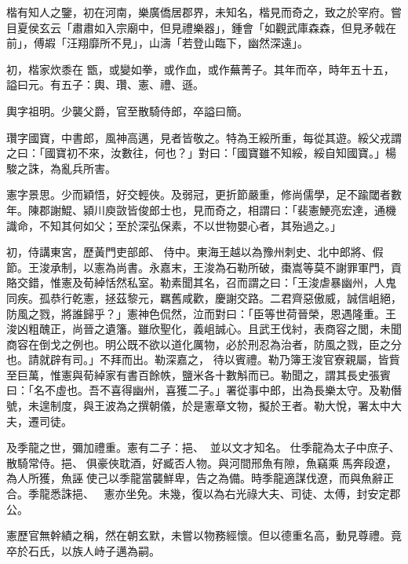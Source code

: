 \begin{pinyinscope}
 楷有知人之鑒，初在河南，樂廣僑居郡界，未知名，楷見而奇之，致之於宰府。嘗目夏侯玄云「肅肅如入宗廟中，但見禮樂器」，鍾會「如觀武庫森森，但見矛戟在前」，傅嘏「汪翔靡所不見」，山濤「若登山臨下，幽然深遠」。



 初，楷家炊黍在
 甑，或變如拳，或作血，或作蕪菁子。其年而卒，時年五十五，謚曰元。有五子：輿、瓚、憲、禮、遜。



 輿字祖明。少襲父爵，官至散騎侍郎，卒謚曰簡。



 瓚字國寶，中書郎，風神高邁，見者皆敬之。特為王綏所重，每從其遊。綏父戎謂之曰：「國寶初不來，汝數往，何也？」對曰：「國寶雖不知綏，綏自知國寶。」楊駿之誅，為亂兵所害。



 憲字景思。少而穎悟，好交輕俠。及弱冠，更折節嚴重，修尚儒學，足不踰閾者數年。陳郡謝鯤、潁川庾敳皆俊郎士也，見而奇之，相謂曰：「裴憲鯁亮宏達，通機識命，不知其何如父；至於深弘保素，不以世物嬰心者，其殆過之。」



 初，侍講東宮，歷黃門吏部郎、
 侍中。東海王越以為豫州刺史、北中郎將、假節。王浚承制，以憲為尚書。永嘉末，王浚為石勒所破，棗嵩等莫不謝罪軍門，貢賂交錯，惟憲及荀綽恬然私室。勒素聞其名，召而謂之曰：「王浚虐暴幽州，人鬼同疾。孤恭行乾憲，拯茲黎元，羈舊咸歡，慶謝交路。二君齊惡傲威，誠信岨絕，防風之戮，將誰歸乎？」憲神色侃然，泣而對曰：「臣等世荷晉榮，恩遇隆重。王浚凶粗醜正，尚晉之遺籓。雖欣聖化，義岨誠心。且武王伐紂，表商容之閭，未聞商容在倒戈之例也。明公既不欲以道化厲物，必於刑忍為治者，防風之戮，臣之分也。請就辟有司。」不拜而出。勒深嘉之，
 待以賓禮。勒乃簿王浚官寮親屬，皆貲至巨萬，惟憲與荀綽家有書百餘帙，鹽米各十數斛而已。勒聞之，謂其長史張賓曰：「名不虛也。吾不喜得幽州，喜獲二子。」署從事中郎，出為長樂太守。及勒僭號，未遑制度，與王波為之撰朝儀，於是憲章文物，擬於王者。勒大悅，署太中大夫，遷司徒。



 及季龍之世，彌加禮重。憲有二子：挹、，並以文才知名。仕季龍為太子中庶子、散騎常侍。挹、俱豪俠耽酒，好臧否人物。與河間邢魚有隙，魚竊乘馬奔段遼，為人所獲，魚誣使己以季龍當襲鮮卑，告之為備。時季龍適謀伐遼，而與魚辭正合。季龍悉誅挹、，
 憲亦坐免。未幾，復以為右光祿大夫、司徒、太傅，封安定郡公。



 憲歷官無幹績之稱，然在朝玄默，未嘗以物務經懷。但以德重名高，動見尊禮。竟卒於石氏，以族人峙子邁為嗣。




\end{pinyinscope}
